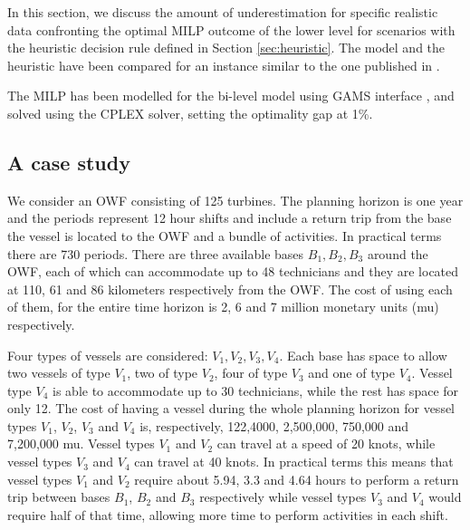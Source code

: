 In this section, we discuss the amount of underestimation for specific realistic data confronting the optimal MILP outcome of the lower level for scenarios with the heuristic decision rule defined in Section \ref{sec:heuristic}.
%
The model and the heuristic have been compared for an instance similar to the one published in \cite{GutierrezAlcoba:ICCS2017}.

The MILP has been modelled for the bi-level model using GAMS interface \cite{gams}, and solved using the CPLEX solver, setting the optimality gap at 1\%.

\subsection{A case study}

We consider an OWF consisting of 125 turbines. The planning horizon is one year and the periods represent 12 hour shifts and include a return trip from the base the vessel is located to the OWF and a bundle of activities. In practical terms there are 730 periods. There are three available bases $B_1,B_2,B_3$ around the OWF, each of which can accommodate up to 48 technicians and they are located at 110, 61  and 86 kilometers respectively from the OWF. The cost of using each of them, for the entire time horizon is 2, 6 and 7 million monetary units (mu) respectively.

Four types of vessels are considered: $V_1,V_2,V_3,V_4$. Each base has space to allow two vessels of type $V_1$, two of type $V_2$, four of type $V_3$ and one of type $V_4$. Vessel type $V_4$ is able to accommodate up to 30 technicians, while the rest has space for only 12. The cost of having a vessel during the whole planning horizon for vessel types $V_1$, $V_2$, $V_3$ and $V_4$ is, respectively, 122,4000, 2,500,000, 750,000 and 7,200,000 mu. Vessel types $V_1$ and $V_2$ can travel at a speed of 20 knots, while vessel types $V_3$ and $V_4$ can travel at 40 knots. In practical terms this means that vessel types $V_1$ and $V_2$ require about 5.94, 3.3 and 4.64 hours to perform a return trip between bases $B_1$, $B_2$ and $B_3$ respectively while vessel types $V_3$ and $V_4$ would require half of that time, allowing more time to perform activities in each shift.

